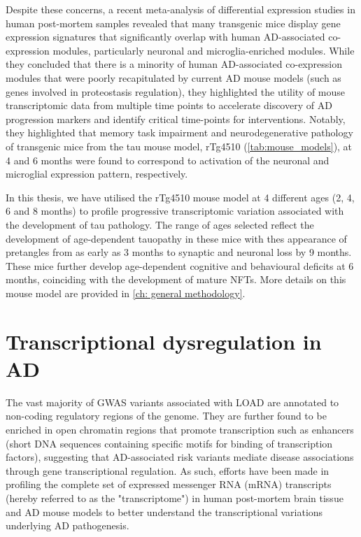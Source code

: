 Despite these concerns, a recent meta-analysis of differential expression studies in human post-mortem samples revealed that many transgenic mice display gene expression signatures that significantly overlap with human AD-associated co-expression modules, particularly neuronal and microglia-enriched modules\cite{Wan2020}. While they concluded that there is a minority of human AD-associated co-expression modules that were poorly recapitulated by current AD mouse models (such as genes involved in proteostasis regulation), they highlighted the utility of mouse transcriptomic data from multiple time points to accelerate discovery of AD progression markers and identify critical time-points for interventions. Notably, they highlighted that memory task impairment and neurodegenerative pathology of transgenic mice from the tau mouse model, rTg4510 (\cref{tab:mouse_models}), at 4 and 6 months were found to correspond to activation of the neuronal and microglial expression pattern, respectively. 

In this thesis, we have utilised the rTg4510 mouse model at 4 different ages (2, 4, 6 and 8 months) to profile progressive transcriptomic variation associated with the development of tau pathology. The range of ages selected reflect the development of age-dependent tauopathy in these mice with thes appearance of pretangles from as early as 3 months to synaptic and neuronal loss by 9 months. These mice further develop age-dependent cognitive and behavioural deficits at 6 months, coinciding with the development of mature NFTs\cite{Cook2014}. More details on this mouse model are provided in \cref{ch: general methodology}. 


\clearpage
\section{Transcriptional dysregulation in AD}

The vast majority of GWAS variants associated with LOAD are annotated to non-coding regulatory regions of the genome\cite{Kunkle2019,Lambert2013}. They are further found to be enriched in open chromatin regions that promote transcription such as enhancers\cite{Kikuchi2019} (short DNA sequences containing specific motifs for binding of transcription factors), suggesting that AD-associated risk variants mediate disease associations through gene transcriptional regulation. As such, efforts have been made in profiling the complete set of expressed messenger RNA (mRNA) transcripts (hereby referred to as the "transcriptome") in human post-mortem brain tissue and AD mouse models to better understand the transcriptional variations underlying AD pathogenesis. 

